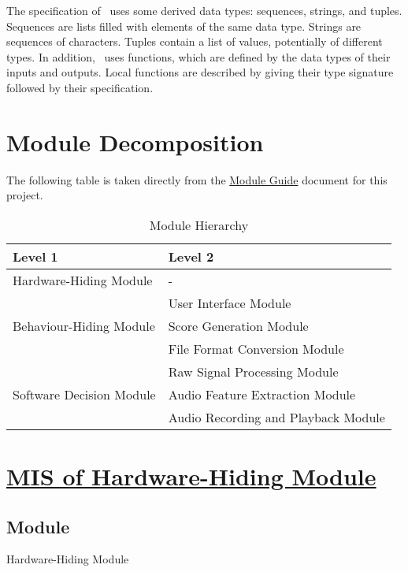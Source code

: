 \documentclass[12pt, titlepage]{article}
\begin{document}
\noindent
The specification of \progname \ uses some derived data types: sequences, strings, and
tuples. Sequences are lists filled with elements of the same data type. Strings
are sequences of characters. Tuples contain a list of values, potentially of
different types. In addition, \progname \ uses functions, which
are defined by the data types of their inputs and outputs. Local functions are
described by giving their type signature followed by their specification.

\section{Module Decomposition}

The following table is taken directly from the 
\href{https://github.com/emilyperica/ScoreGen/blob/main/docs/Design/SoftArchitecture/MG.pdf}
{Module Guide} document for this project.

\begin{table}[h!]
  \centering
  \begin{tabular}{p{} p{}}
  \toprule
  \textbf{Level 1} & \textbf{Level 2}\\
  \midrule

  {Hardware-Hiding Module} & -\\
  \midrule

  \multirow{3}{0.3\textwidth}{Behaviour-Hiding Module} 
  & User Interface Module \\
  & Score Generation Module \\
  & File Format Conversion Module \\
  \midrule

  \multirow{3}{0.3\textwidth}{Software Decision Module} 
  & Raw Signal Processing Module \\
  & Audio Feature Extraction Module \\
  & Audio Recording and Playback Module \\
  \bottomrule

  \end{tabular}
  \caption{Module Hierarchy}
  \label{TblMH}
\end{table}

\newpage

\section{\hyperref[mHH]{MIS of Hardware-Hiding Module}} \label{M1}

\subsection{Module}  
Hardware-Hiding Module  
\end{document}
